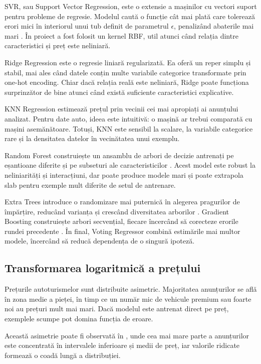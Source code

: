 SVR, sau Support Vector Regression, este o extensie a mașinilor cu vectori suport pentru probleme de regresie. Modelul caută o funcție cât mai plată care tolerează erori mici în interiorul unui tub definit de parametrul \(\epsilon\), penalizând abaterile mai mari \cite{smola2004tutorial}. În proiect a fost folosit un kernel RBF, util atunci când relația dintre caracteristici și preț este neliniară.

Ridge Regression este o regresie liniară regularizată. Ea oferă un reper simplu și stabil, mai ales când datele conțin multe variabile categorice transformate prin one-hot encoding. Chiar dacă relația reală este neliniară, Ridge poate funcționa surprinzător de bine atunci când există suficiente caracteristici explicative.

KNN Regression estimează prețul prin vecinii cei mai apropiați ai anunțului analizat. Pentru date auto, ideea este intuitivă: o mașină ar trebui comparată cu mașini asemănătoare. Totuși, KNN este sensibil la scalare, la variabile categorice rare și la densitatea datelor în vecinătatea unui exemplu.

Random Forest construiește un ansamblu de arbori de decizie antrenați pe eșantioane diferite și pe subseturi ale caracteristicilor \cite{breiman2001random}. Acest model este robust la neliniarități și interacțiuni, dar poate produce modele mari și poate extrapola slab pentru exemple mult diferite de setul de antrenare.

Extra Trees introduce o randomizare mai puternică în alegerea pragurilor de împărțire, reducând varianța și crescând diversitatea arborilor \cite{geurts2006extremely}. Gradient Boosting construiește arbori secvențial, fiecare încercând să corecteze erorile rundei precedente \cite{friedman2001greedy}. În final, Voting Regressor combină estimările mai multor modele, încercând să reducă dependența de o singură ipoteză.

\subsection{Transformarea logaritmică a prețului}
\label{sec:background-log}

Prețurile autoturismelor sunt distribuite asimetric. Majoritatea anunțurilor se află în zona medie a pieței, în timp ce un număr mic de vehicule premium sau foarte noi au prețuri mult mai mari. Dacă modelul este antrenat direct pe preț, exemplele scumpe pot domina funcția de eroare.

Această asimetrie poate fi observată în , unde cea mai mare parte a anunțurilor este concentrată în intervalele inferioare și medii de preț, iar valorile ridicate formează o coadă lungă a distribuției.

